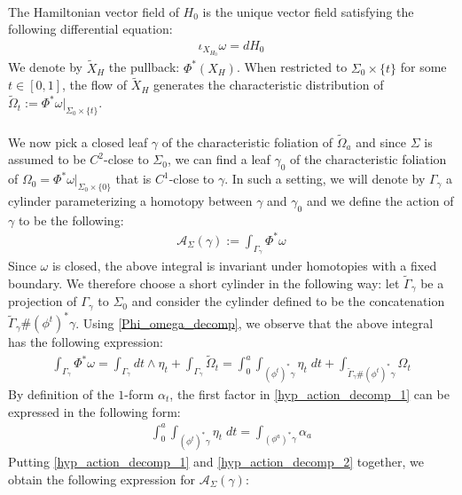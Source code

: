 \documentclass[11pt]{amsart}
\theoremstyle{plain}
\theoremstyle{definition}
\theoremstyle{remark}
\begin{document}
\\
The Hamiltonian vector field of $H_0$ is the unique vector field satisfying the following differential equation:
\begin{align}
    \iota_{X_{H_0}}\omega = dH_0
\end{align}
We denote by $\tilde X_H$ the pullback: $\Phi^*(X_H)$. When restricted to $\Sigma_0 \times \{t\}$ for some $t \in [0,1] $, the flow of $\tilde X_H$ generates the characteristic distribution of $\tilde \Omega_t:= \Phi^*\omega\big\vert_{\Sigma_0 \times \{t\}}$.\\
\\
We now pick a closed leaf $\gamma$ of the characteristic foliation of $\tilde \Omega_a$ and since $\Sigma$ is assumed to be $C^2$-close to $\Sigma_0$, we can find a leaf $ \gamma_0$ of the characteristic foliation of $\Omega_0= \Phi^*\omega\big\vert_{\Sigma_0\times \{0\}}$ that is $C^1$-close to $\gamma$. In such a setting, we will denote by $\Gamma_{\gamma}$ a cylinder parameterizing a homotopy between $\gamma$ and $\gamma_0$ and we define the action of $\gamma$ to be the following:
\begin{align}
    \mathcal{A}_{\Sigma}(\gamma):= \int_{\Gamma_{\gamma}}\Phi^*\omega
\end{align}
Since $\omega$ is closed, the above integral is invariant under homotopies with a fixed boundary. We therefore choose a short cylinder in the following way: let $\tilde \Gamma_{\gamma}$ be a projection of $\Gamma_{\gamma}$ to $\Sigma_0$ and consider the cylinder defined to be the concatenation $\tilde \Gamma_{\gamma} \# (\phi^t)^*\gamma$. Using \eqref{Phi_omega_decomp}, we observe that the above integral has the following expression:
\begin{align}\label{hyp_action_decomp_1}
    \int_{\Gamma_{\gamma}}\Phi^*\omega = \int_{\Gamma_{\gamma}} dt \wedge \eta_t +  \int_{\Gamma_{\gamma}} \tilde \Omega_t   =\int^a_0\int_{(\phi^t)^*\gamma} \eta_t \; dt + \int_{\tilde \Gamma_{\gamma} \# (\phi^t)^*\gamma} \Omega_t
\end{align}
By definition of the $1$-form $\alpha_t$, the first factor in \eqref{hyp_action_decomp_1} can be expressed in the following form:
\begin{align}\label{hyp_action_decomp_2}
\int^a_0\int_{(\phi^t)^*\gamma} \eta_t \; dt = \int_{(\phi^a)^*\gamma} \alpha_a
\end{align}
Putting \eqref{hyp_action_decomp_1} and \eqref{hyp_action_decomp_2} together, we obtain the following expression for $\mathcal{A}_{\Sigma}(\gamma)$:
\end{document}
